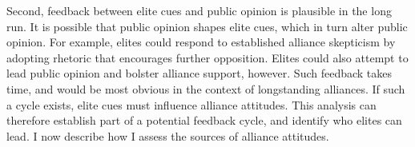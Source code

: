 \documentclass[12pt]{article}
\begin{document}
%
%
%
%
%



Second, feedback between elite cues and public opinion is plausible in the long run. 
It is possible that public opinion shapes elite cues, which in turn alter public opinion. 
For example, elites could respond to established alliance skepticism by adopting rhetoric that encourages further opposition. 
Elites could also attempt to lead public opinion and bolster alliance support, however.
Such feedback takes time, and would be most obvious in the context of longstanding alliances.
If such a cycle exists, elite cues must influence alliance attitudes.
This analysis can therefore establish part of a potential feedback cycle, and identify who elites can lead.  
I now describe how I assess the sources of alliance attitudes. 
\end{document}
